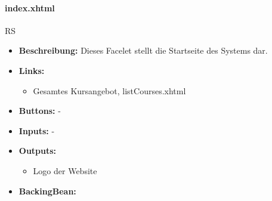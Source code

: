 				\paragraph{index.xhtml}
					RS\\
					\begin{itemize}
						\item \textbf{Beschreibung:} Dieses Facelet stellt die Startseite des Systems dar.
						\item \textbf{Links:}
							\begin{itemize}
								\item Gesamtes Kursangebot, listCourses.xhtml
							\end{itemize}
						\item \textbf{Buttons:} -
						\item \textbf{Inputs:} -
						\item \textbf{Outputs:}
							\begin{itemize}
								\item Logo der Website
							\end{itemize}
						\item \textbf{BackingBean:}
					\end{itemize}
				

